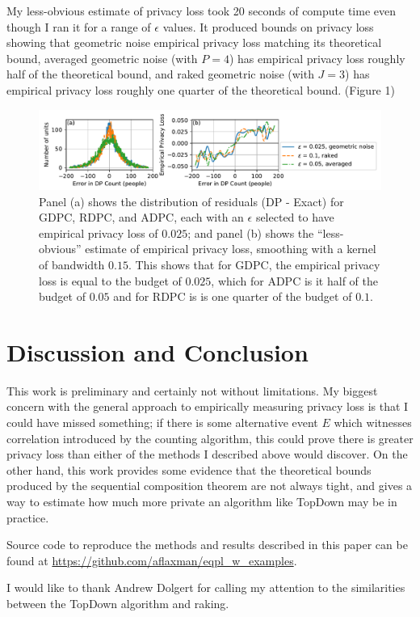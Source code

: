 \documentclass{article}
\begin{document}
My less-obvious estimate of privacy loss took 20 seconds of compute time even though I ran it for a range of $\epsilon$ values.  It produced bounds on privacy loss showing that geometric noise empirical privacy loss matching its theoretical bound, averaged geometric noise (with $P=4$) has empirical privacy loss roughly half of the theoretical bound, and raked geometric noise (with $J=3$) has empirical privacy loss roughly one quarter of the theoretical bound. (Figure 1)

\begin{figure}[h]
  \includegraphics[width=\linewidth]{fig.pdf}
 \caption{Panel (a) shows the distribution of residuals (DP - Exact) for
GDPC, RDPC, and ADPC, each with an $\epsilon$ selected to have empirical privacy loss of $0.025$; and panel (b) shows the ``less-obvious'' estimate of empirical privacy
loss, smoothing with a kernel of bandwidth
$0.15$. This shows that for GDPC, the empirical privacy loss is equal to the budget of $0.025$, which for ADPC is it half of the budget of $0.05$ and for RDPC is is one quarter of the budget of $0.1$.}
\end{figure}

\section{Discussion and Conclusion}

This work is preliminary and certainly not without limitations.  My biggest concern with the general approach to empirically measuring privacy loss is that I could have missed something; if there is some alternative event $E$ which witnesses correlation introduced by the counting algorithm, this could prove there is greater privacy loss than either of the methods I described above would discover.  On the other hand, this work provides some evidence that the theoretical bounds produced by the sequential composition theorem are not always tight, and gives a way to estimate how much more private an algorithm like TopDown may be in practice.



Source code to reproduce the methods and results described in this paper can be found at \url{https://github.com/aflaxman/eqpl_w_examples}.

I would like to thank Andrew Dolgert for calling my attention to the similarities between the TopDown algorithm and raking.
\end{document}
